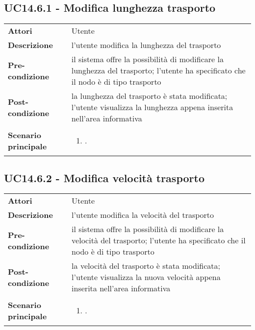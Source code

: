 \subsection{UC14.6.1 - Modifica lunghezza trasporto} 
\label{sssec:UC14.6.1} 
\def\arraystretch{1.5}
\begin{tabularx}{\textwidth}{l|p{}}
	\rowcolor{I} \multicolumn{2}{c}{\color{white}\textbf{UC14.6.1 - Modifica lunghezza trasporto}} \\
	\toprule
	\endhead
	\textbf{Attori} & Utente\\
	\textbf{Descrizione} & l'utente modifica la lunghezza del trasporto\\
	\textbf{Pre-condizione} & il sistema offre la possibilità di modificare la lunghezza del trasporto; l'utente ha specificato che il nodo è di tipo trasporto\\
	\textbf{Post-condizione} & la lunghezza del trasporto è stata modificata; l'utente visualizza la lunghezza appena inserita nell'area informativa\\
	\textbf{Scenario principale} & \vspace{-1.2em}\begin{enumerate}[leftmargin=*,noitemsep,nosep]
		\item \nameref{sssec:UC14.6.1}.
	\end{enumerate}\\
	\bottomrule
\end{tabularx}
\subsection{UC14.6.2 - Modifica velocità trasporto} 
\label{sssec:UC14.6.2} 
\def\arraystretch{1.5}
\begin{tabularx}{\textwidth}{l|p{}}
	\rowcolor{I} \multicolumn{2}{c}{\color{white}\textbf{UC14.6.2 - Modifica velocità trasporto}} \\
	\toprule
	\endhead
	\textbf{Attori} & Utente\\
	\textbf{Descrizione} & l'utente modifica la velocità del trasporto\\
	\textbf{Pre-condizione} & il sistema offre la possibilità di modificare la velocità del trasporto; l'utente ha specificato che il nodo è di tipo trasporto\\
	\textbf{Post-condizione} & la velocità del trasporto è stata modificata; l'utente visualizza la nuova velocità appena inserita nell'area informativa\\
	\textbf{Scenario principale} & \vspace{-1.2em}\begin{enumerate}[leftmargin=*,noitemsep,nosep]
		\item \nameref{sssec:UC14.6.2}.
	\end{enumerate}\\
	\bottomrule
\end{tabularx}
